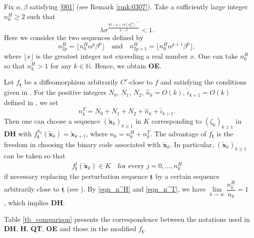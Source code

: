 \documentclass{amsart}
\theoremstyle{plain}
\theoremstyle{definition}
\theoremstyle{remark}
\numberwithin{equation}{section}
\begin{document}
Fix $\alpha,\beta$
satisfying \eqref{001} (see Remark \ref{rmk:0307}).
Take 
a sufficiently large integer $n_0^H\geq 2$ 
such that 
$$\lambda\sigma^{\frac{9\beta-6+18(n_0^H)^{-1}}{2-\beta}}<1.
$$
Here we consider the two sequences defined by
\begin{equation}\label{eqn_n^H}
n_{2p}^H=\lfloor n_0^H\alpha^p\beta^p\rfloor\quad\text{and}\quad n_{2p+1}^H=\lfloor n_0^H\alpha^{p+1}\beta^p\rfloor,
\end{equation}
where $\lfloor x\rfloor$ is the greatest integer not exceeding a real number $x$.
One can take $n_0^H$ so that $n_k^H>1$ for any $k\in \mathbb{N}$.
Hence, 
we obtain {\bf OE}.


Let $f_{\underline{\boldsymbol{t}}}$ be a diffeomorphism arbitrarily $C^r$-close to $f$ and satisfying the conditions given in \cite{KS2017}.
For the positive integers $N_0$, $N_1$, $N_2$, $\widehat n_k=O(k)$, $\widehat i_{k+1}=O(k)$ 
defined in \cite{KS2017}, we set 
\begin{equation}\label{eqn_n^T}
n_k^T=N_0+N_1+N_2+\widehat n_k+\widehat i_{k+1}.
\end{equation}
Then one can choose a sequence $(\widetilde{\boldsymbol{x}}_k)_{k\geq 1}$ in $K$ corresponding to $(\zeta_k)_{k\geq 1}$ in {\bf DH} 
with $f_{\underline{\boldsymbol{t}}}^{n_k}(\widetilde{\boldsymbol{x}}_k)= \widetilde{\boldsymbol{x}}_{k+1}$, 
where $n_k=n_k^H+n_k^T$. 
The advantage of $f_{\underline{\boldsymbol{t}}}$ is the freedom in choosing the binary code associated 
with $\widetilde{\boldsymbol{x}}_k$.
In particular, $(\widetilde{\boldsymbol{x}}_k)_{k\geq 1}$ can be taken so that 
\begin{equation}\label{eq:251012}
f_{\underline{\boldsymbol{t}}}^j(\widetilde{\boldsymbol{x}}_k)\in K\quad \text{for every $j=0,\dots,n_k^H$}
\end{equation}
if necessary replacing the perturbation sequence $\underline{\boldsymbol{t}}$ by 
a certain sequence arbitrarily close to $\underline{\boldsymbol{t}}$ (see \cite[Equation (7.19)]{KS2017}).
By \eqref{eqn_n^H} and \eqref{eqn_n^T}, we have $\lim\limits_{k\to \infty}\dfrac{n_k^H}{n_k}=1$, 
which implies {\bf DH}.

Table \ref{tb_comparison} presents the correspondence between the notations used in 
{\bf DH}, {\bf H}, {\bf QT}, {\bf OE} and those in the modified $f_{\underline{\boldsymbol{t}}}$.
\setlength{\tabcolsep}{13pt}
\renewcommand{\arraystretch}{1.4}
\end{document}
